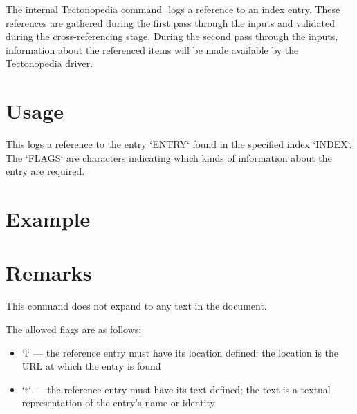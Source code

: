 
The internal Tectonopedia command \b{\string\pediaLogRef} logs a reference to an
index entry. These references are gathered during the first pass through the
inputs and validated during the cross-referencing stage. During the second pass
through the inputs, information about the referenced items will be made
available by the Tectonopedia driver.

\section*{Usage}

\begin{texdisp}
\end{texdisp}

This logs a reference to the entry \tex`ENTRY` found in the specified index
\tex`INDEX`. The \tex`FLAGS` are characters indicating which kinds of
information about the entry are required.

\section*{Example}

\begin{texdisp}
\end{texdisp}

\section*{Remarks}

This command does not expand to any text in the document.

The allowed flags are as follows:

\begin{itemize}
\item \tex`l` — the reference entry must have its location defined; the
    location is the URL at which the entry is found
\item \tex`t` — the reference entry must have its text defined; the text
    is a textual representation of the entry's name or identity
\end{itemize}




